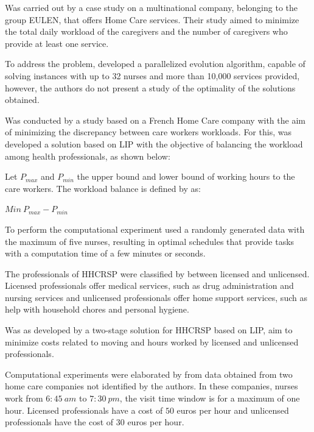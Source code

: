 Was carried out by  a case study on a multinational company, belonging to the group EULEN, that offers Home Care services.
Their study aimed to minimize the total daily workload of the caregivers and the number of caregivers who provide at least one service.

To address the problem,  developed a parallelized evolution algorithm, capable of solving instances with up to 32 nurses and more than 10,000 services provided, however, the authors do not present a study of the optimality of the solutions obtained.

Was conducted by  a study based on a French Home Care company with the aim of minimizing the discrepancy between care workers workloads. 
For this, was developed a solution based on \ac{LIP}  with the objective of balancing the workload among health professionals, as shown below:

Let $P_{max}$ and $P_{min}$ the upper bound and lower bound of working hours to the care workers. The workload balance is defined by  as:  

\begin{center}
$Min~P_{max} - P_{min}$
\end{center}

To perform the computational experiment   used a randomly generated data with the maximum of five nurses, resulting in optimal schedules that provide tasks with a computation time of a few minutes or seconds.

The professionals of \ac{HHCRSP} were classified by  between licensed and unlicensed. Licensed professionals offer medical services, such as drug administration and nursing services and unlicensed professionals offer home support services, such as help with household chores and personal hygiene.

Was as developed by  a two-stage solution for \ac{HHCRSP} based on \ac{LIP},  aim to minimize costs related to moving and hours worked by licensed and unlicensed professionals.

Computational experiments were elaborated by  from data obtained from two home care companies not identified by the authors. In these companies, nurses work from $6:45 \ am$ to $7:30 \ pm$, the visit time window is for a maximum of one hour. Licensed professionals have a cost of $50$ euros per hour and unlicensed professionals have the cost of $30$ euros per hour.

